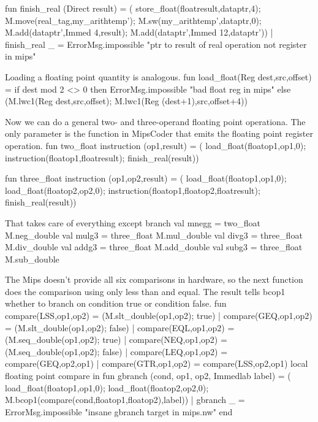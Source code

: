 fun finish_real (Direct result) = (
    store_float(floatresult,dataptr,4);
    M.move(real_tag,my_arithtemp');
    M.sw(my_arithtemp',dataptr,0);
    M.add(dataptr',Immed 4,result);
    M.add(dataptr',Immed 12,dataptr'))
  | finish_real _ = 
     ErrorMsg.impossible "ptr to result of real operation not register in mips"

\endcode
{}
Loading a floating point quantity is analogous.
\enddocs
{}
\endmoddef
fun load_float(Reg dest,src,offset) =
    if dest mod 2 <> 0 then ErrorMsg.impossible "bad float reg in mips"
    else (M.lwc1(Reg dest,src,offset); M.lwc1(Reg (dest+1),src,offset+4))

\endcode
{}
Now we can do a general two- and three-operand floating point operationa.
The only parameter is the function in \code{}MipsCoder\edoc{} that
emits the floating point register operation.
\enddocs
{}
\endmoddef
fun two_float instruction (op1,result) = (
    load_float(floatop1,op1,0);
    instruction(floatop1,floatresult);
    finish_real(result))

fun three_float instruction (op1,op2,result) = (
    load_float(floatop1,op1,0);
    load_float(floatop2,op2,0);
    instruction(floatop1,floatop2,floatresult);
    finish_real(result))

\endcode
{}
That takes care of everything except branch
\enddocs
{}
\endmoddef
val mnegg = two_float M.neg_double
val mulg3 = three_float M.mul_double
val divg3 = three_float M.div_double
val addg3 = three_float M.add_double
val subg3 = three_float M.sub_double


\endcode
{}
The Mips doesn't provide all six comparisons in hardware, so the
next function does the comparison using only less than and equal.
The result tells \code{}bcop1\edoc{} whether to branch on condition true
or condition false.
\enddocs
{}
\endmoddef
fun compare(LSS,op1,op2) = (M.slt_double(op1,op2); true)
  | compare(GEQ,op1,op2) = (M.slt_double(op1,op2); false)
  | compare(EQL,op1,op2) = (M.seq_double(op1,op2); true)
  | compare(NEQ,op1,op2) = (M.seq_double(op1,op2); false)
  | compare(LEQ,op1,op2) = compare(GEQ,op2,op1)
  | compare(GTR,op1,op2) = compare(LSS,op2,op1)
\endcode
{}
\endmoddef
local
    \LA{}floating point compare\RA{}
in
    fun gbranch (cond, op1, op2, Immedlab label) = (
            load_float(floatop1,op1,0);
            load_float(floatop2,op2,0);
            M.bcop1(compare(cond,floatop1,floatop2),label))
      | gbranch _ = ErrorMsg.impossible "insane gbranch target in mips.nw"
end
        

